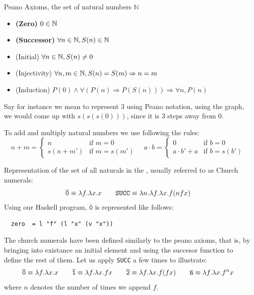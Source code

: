 \begin{definition} Peano Axioms, the set of natural numbers $\mathbb{N}$
\begin{itemize}
\item \textbf{(Zero)} \( 0 \in \mathbb{N} \)
\item \textbf{(Successor)} \( \forall n \in \mathbb{N}, S(n) \in \mathbb{N} \)
\item (Initial) \( \forall n \in \mathbb{N}, S(n) \neq 0 \) \label{def:peano-nat-initial}
\item (Injectivity) \( \forall n, m \in \mathbb{N}, S(n) = S(m) \Rightarrow n = m \)
\item (Induction) \( P(0) \land \forall ( P(n) \Rightarrow P(S(n))) \Rightarrow \forall n,  P (n) \)
\end{itemize}
\end{definition}
\begin{example}
  Say for instance we mean to represent $ 3 $ using Peano notation, using the graph, we would come up with $ s(s(s(0))) $, since it is $3$ steps away from $0$.
\end{example}
\begin{definition} To add and multiply natural numbers we use following the rules:
  \[
    n + m = 
    \begin{cases}
      n & \text{if } m = 0 \\
      s(n + m') & \text{if } m = s(m')
    \end{cases}
    \quad
    a \cdot b =
    \begin{cases}
      0 & \text{if } b = 0 \\
      a \cdot b' + a & \text{if } b = s(b')
    \end{cases}
  \]
\end{definition}
\begin{definition} Representation of the set of all naturals in the \lcalc, usually referred to as Church numerals:
  \label{def:church-naturals}
\[
    \overline{\texttt{0}} \equiv \lambda f.\lambda x. x \qquad \texttt{SUCC} \equiv \lambda n. \lambda f. \lambda x . f ( n f x )
\]
  Using our Haskell program, $\overline{\texttt{0}}$ is represented like follows:
  \begin{verbatim}
  zero  = l "f" (l "x" (v "x"))
  \end{verbatim}
\end{definition}
\begin{example}
  The church numerals have been defined similarly to the peano axioms, that is, by bringing into existance an initial element and using the succesor function to define the rest of them. Let us apply \texttt{SUCC} a few times to illustrate:
\[
    \overline{\texttt{0}} \equiv \lambda f.\lambda x. x \qquad
    \overline{\texttt{1}} \equiv \lambda f.\lambda x. f x \qquad
    \overline{\texttt{2}} \equiv \lambda f.\lambda x. f (f x) \qquad
    \overline{\texttt{n}} \equiv \lambda f.\lambda x. f ^ n x
\]
  where $ n $ denotes the number of times we append $ f $.
\end{example}
